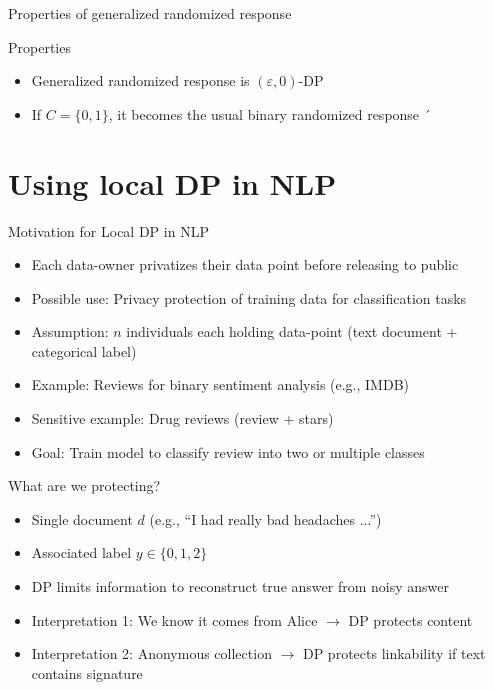 \documentclass[12pt,aspectratio=169,handout]{beamer}
\begin{document}
\begin{frame}{Properties of generalized randomized response}

\begin{block}{Properties}
\begin{itemize}
\item Generalized randomized response is $(\varepsilon, 0)$-DP
\item If $C = \{0, 1\}$, it becomes the usual binary randomized response
´\end{itemize}
\end{block}
\end{frame}


\section{Using local DP in NLP}

\begin{frame}{Motivation for Local DP in NLP}
\begin{itemize}
\item Each data-owner privatizes their data point before releasing to public
\item Possible use: Privacy protection of training data for classification tasks
\item Assumption: $n$ individuals each holding data-point (text document + categorical label)
\item Example: Reviews for binary sentiment analysis (e.g., IMDB)
\item Sensitive example: Drug reviews (review + stars)
\item Goal: Train model to classify review into two or multiple classes
\end{itemize}
\end{frame}

\begin{frame}{What are we protecting?}
\begin{itemize}
\item Single document $d$ (e.g., ``I had really bad headaches ...'')
\item Associated label $y \in \{0, 1, 2\}$
\item DP limits information to reconstruct true answer from noisy answer
\item Interpretation 1: We know it comes from Alice $\rightarrow$ DP protects content
\item Interpretation 2: Anonymous collection $\rightarrow$ DP protects linkability if text contains signature
\end{itemize}
\end{frame}
\end{document}
